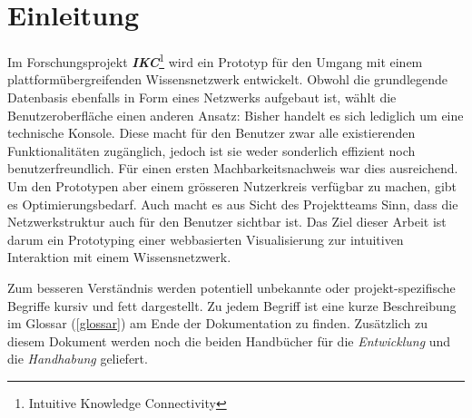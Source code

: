 \chapter{Einleitung}

Im Forschungsprojekt \textbf{\textit{IKC}}\footnote{\gls{Intuitive Knowledge Connectivity}} wird ein Prototyp für den Umgang mit einem plattformübergreifenden Wissensnetzwerk entwickelt. Obwohl die grundlegende Datenbasis ebenfalls in Form eines Netzwerks aufgebaut ist, wählt die Benutzeroberfläche einen anderen Ansatz: Bisher handelt es sich lediglich um eine technische Konsole. Diese macht für den Benutzer zwar alle existierenden Funktionalitäten zugänglich, jedoch ist sie weder sonderlich effizient noch benutzerfreundlich. Für einen ersten Machbarkeitsnachweis war dies ausreichend. Um den Prototypen aber einem grösseren Nutzerkreis verfügbar zu machen, gibt es Optimierungsbedarf. Auch macht es aus Sicht des Projektteams Sinn, dass die Netzwerkstruktur auch für den Benutzer sichtbar ist. Das Ziel dieser Arbeit ist darum ein Prototyping einer webbasierten Visualisierung zur intuitiven Interaktion mit einem Wissensnetzwerk.

Zum besseren Verständnis werden potentiell unbekannte oder projekt-spezifische Begriffe kursiv und fett dargestellt. Zu jedem Begriff ist eine kurze Beschreibung im Glossar (\autoref{glossar}) am Ende der Dokumentation zu finden. Zusätzlich zu diesem Dokument werden noch die beiden Handbücher für die \textit{Entwicklung} und die \textit{Handhabung} geliefert. 


